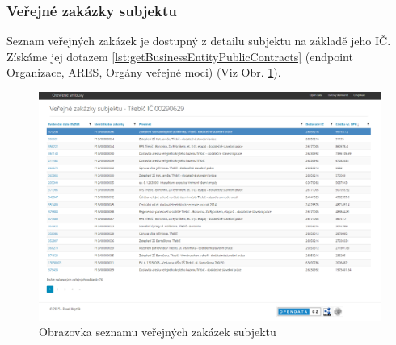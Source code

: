 










\subsubsection*{Veřejné zakázky subjektu}

Seznam veřejných zakázek je dostupný z detailu subjektu na základě jeho IČ. Získáme jej dotazem \ref{lst:getBusinessEntityPublicContracts} (endpoint Organizace, ARES, Orgány veřejné moci) (Viz Obr. \ref{obr:webPublicContracts}).\\

\begin{figure}[H]
\centerline{\includegraphics[width=\textwidth]{img/webPublicContracts.eps}}
\caption{Obrazovka seznamu veřejných zakázek subjektu}
\label{obr:webPublicContracts}
\end{figure}

